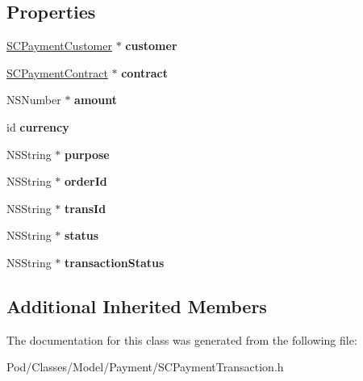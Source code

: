 \subsection*{Properties}
\begin{DoxyCompactItemize}
\item 
\hyperlink{interface_s_c_payment_customer}{S\+C\+Payment\+Customer} $\ast$ {\bfseries customer}\hypertarget{interface_s_c_payment_transaction_a6cbb586a603a698cfa6c555ad6a874bc}{}\label{interface_s_c_payment_transaction_a6cbb586a603a698cfa6c555ad6a874bc}

\item 
\hyperlink{interface_s_c_payment_contract}{S\+C\+Payment\+Contract} $\ast$ {\bfseries contract}\hypertarget{interface_s_c_payment_transaction_a3198303aa719a6ce59623a7c1072037a}{}\label{interface_s_c_payment_transaction_a3198303aa719a6ce59623a7c1072037a}

\item 
N\+S\+Number $\ast$ {\bfseries amount}\hypertarget{interface_s_c_payment_transaction_a387ee51947d3f21802b1c83e335526ad}{}\label{interface_s_c_payment_transaction_a387ee51947d3f21802b1c83e335526ad}

\item 
id {\bfseries currency}\hypertarget{interface_s_c_payment_transaction_a59b636cc2170c2f245e53ef21e126a73}{}\label{interface_s_c_payment_transaction_a59b636cc2170c2f245e53ef21e126a73}

\item 
N\+S\+String $\ast$ {\bfseries purpose}\hypertarget{interface_s_c_payment_transaction_a27cd5998ab26a3c161249d2153230b7d}{}\label{interface_s_c_payment_transaction_a27cd5998ab26a3c161249d2153230b7d}

\item 
N\+S\+String $\ast$ {\bfseries order\+Id}\hypertarget{interface_s_c_payment_transaction_ae05dea594100fc7718c87d915c2a1148}{}\label{interface_s_c_payment_transaction_ae05dea594100fc7718c87d915c2a1148}

\item 
N\+S\+String $\ast$ {\bfseries trans\+Id}\hypertarget{interface_s_c_payment_transaction_abd9346b9e1e1440045fb4ea8ee110b23}{}\label{interface_s_c_payment_transaction_abd9346b9e1e1440045fb4ea8ee110b23}

\item 
N\+S\+String $\ast$ {\bfseries status}\hypertarget{interface_s_c_payment_transaction_a952d6fbebb2b1a9bd94f3f37551efbdb}{}\label{interface_s_c_payment_transaction_a952d6fbebb2b1a9bd94f3f37551efbdb}

\item 
N\+S\+String $\ast$ {\bfseries transaction\+Status}\hypertarget{interface_s_c_payment_transaction_a3ec622e2e7194386c26776bb7a3528ce}{}\label{interface_s_c_payment_transaction_a3ec622e2e7194386c26776bb7a3528ce}

\end{DoxyCompactItemize}
\subsection*{Additional Inherited Members}


The documentation for this class was generated from the following file\+:\begin{DoxyCompactItemize}
\item 
Pod/\+Classes/\+Model/\+Payment/S\+C\+Payment\+Transaction.\+h\end{DoxyCompactItemize}
